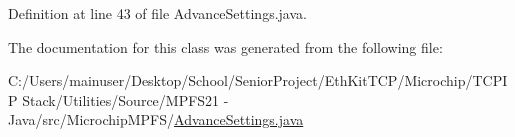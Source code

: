 Definition at line 43 of file Advance\+Settings.\+java.



The documentation for this class was generated from the following file\+:\begin{DoxyCompactItemize}
\item 
C\+:/\+Users/mainuser/\+Desktop/\+School/\+Senior\+Project/\+Eth\+Kit\+T\+C\+P/\+Microchip/\+T\+C\+P\+I\+P Stack/\+Utilities/\+Source/\+M\+P\+F\+S21 -\/ Java/src/\+Microchip\+M\+P\+F\+S/\hyperlink{_advance_settings_8java}{Advance\+Settings.\+java}\end{DoxyCompactItemize}
